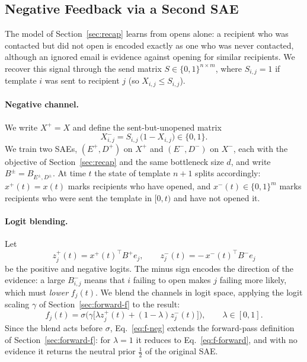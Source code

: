 \subsection{Negative Feedback via a Second SAE}
\label{sec:negative-feedback}

The model of Section~\ref{sec:recap} learns from opens alone: a recipient who
was contacted but did not open is encoded exactly as one who was never
contacted, although an ignored email is evidence against opening for similar
recipients. We recover this signal through the send matrix
$S\in\{0,1\}^{n\times m}$, where $S_{i,j}=1$ if template $i$ was sent to
recipient $j$ (so $X_{i,j}\le S_{i,j}$).

\paragraph{Negative channel.}
We write $X^{+}=X$ and define the sent-but-unopened matrix
\begin{equation}
\label{eq:x-neg}
X^{-}_{i,j} = S_{i,j}\,\big(1-X_{i,j}\big)\in\{0,1\}.
\end{equation}
We train two SAEs, $(E^{+},D^{+})$ on $X^{+}$ and $(E^{-},D^{-})$ on
$X^{-}$, each with the objective of Section~\ref{sec:recap} and the same
bottleneck size $d$, and write $B^{\pm}=B_{E^{\pm},D^{\pm}}$. At time $t$ the
state of template $n{+}1$ splits accordingly: $x^{+}(t)=x(t)$ marks
recipients who have opened, and $x^{-}(t)\in\{0,1\}^m$ marks recipients who
were sent the template in $[0,t)$ and have not opened it.

\paragraph{Logit blending.}
Let
\begin{equation}
\label{eq:z-pm}
z^{+}_j(t) = x^{+}(t)^\top B^{+}e_j,
\qquad
z^{-}_j(t) = -\,x^{-}(t)^\top B^{-}e_j
\end{equation}
be the positive and negative logits. The minus sign encodes the direction
of the evidence: a large $B^{-}_{i,j}$ means that $i$ failing to open makes
$j$ failing more likely, which must \emph{lower} $f_j(t)$. We blend the
channels in logit space, applying the logit scaling $\gamma$ of
Section~\ref{sec:forward-f} to the result:
\begin{equation}
\label{eq:f-neg}
f_j(t) = \sigma\Big(\gamma\big[\lambda z^{+}_j(t) + (1-\lambda)z^{-}_j(t)\big]\Big),
\qquad \lambda\in[0,1].
\end{equation}
Since the blend acts before $\sigma$, Eq.~\eqref{eq:f-neg} extends the
forward-pass definition of Section~\ref{sec:forward-f}: for $\lambda=1$ it
reduces to Eq.~\eqref{eq:f-forward}, and with no evidence it returns the
neutral prior $\tfrac12$ of the original SAE.

